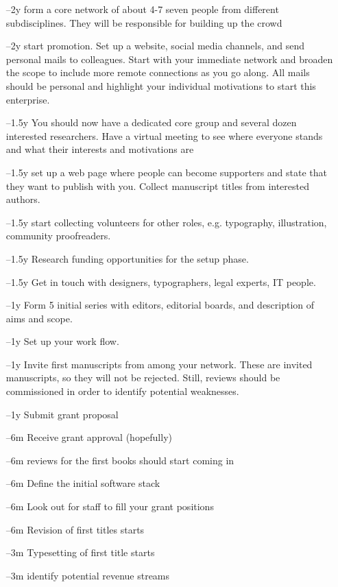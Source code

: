 \documentclass[nonflat,smallfont
]{langsci/langscibook}
\begin{document}
\begin{itemize}
 \item[--2y] form a core network of about 4-7 seven people from different subdisciplines. They will be responsible for building up the crowd 
 \item[--2y] start promotion. Set up a website, social media channels, and send personal mails to colleagues. Start with your immediate network and broaden the scope to include more remote connections as you go along. All mails should be personal and highlight your individual motivations to start this enterprise. 
 \item [--1.5y] You should now have a dedicated core group and several dozen interested researchers. Have a virtual meeting to see where everyone stands and what their interests and motivations are 
 \item[--1.5y] set up a web page where people can become supporters and state that they want to publish with you. Collect manuscript titles from interested authors. 
 \item[--1.5y] start collecting volunteers for other roles, e.g. typography, illustration, community proofreaders. 
 \item [--1.5y] Research funding opportunities for the setup phase.
 \item[--1.5y] Get in touch with designers, typographers, legal experts, IT people.
 \item[--1y] Form 5 initial series with editors, editorial boards, and description of aims and scope.
 \item[--1y] Set up your work flow.
 \item[--1y] Invite first manuscripts from among your network.  These are invited manu\-scripts, so they will not be rejected. Still, reviews should be commissioned in order to identify potential weaknesses.
 \item[--1y] Submit grant proposal 
 \item[--6m] Receive grant approval (hopefully)
 \item [--6m] reviews for the first books should start coming in
 \item[--6m] Define the initial software stack
 \item[--6m] Look out for staff to fill your grant positions
 \item[--6m] Revision of first titles starts
 \item[--3m] Typesetting of first title starts
 \item[--3m] identify potential revenue streams

\end{itemize}
\end{document}
